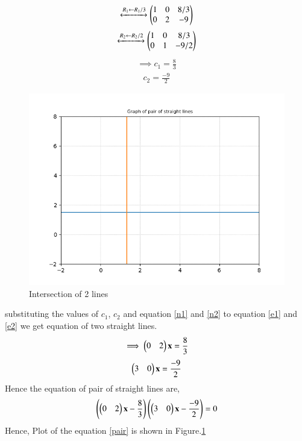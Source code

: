 \documentclass[journal,12pt,twocolumn]{IEEEtran}
\begin{document}
\begin{align}
\xleftrightarrow[]{R_1\leftarrow R_1/3}\begin{pmatrix}1&0&8/3\\0&2&-9\end{pmatrix}
\end{align}
\begin{align}
\xleftrightarrow[]{R_2\leftarrow R_2/2}\begin{pmatrix}1&0&8/3\\0&1&-9/2\end{pmatrix}
\end{align}
\begin{align}
\implies c_1 = \frac{8}{3}
\end{align}
\begin{align}
c_2 = \frac{-9}{2}
\end{align}
\begin{figure}[ht!]
\centering
\includegraphics[width=\columnwidth]{Figure_1.png}
\caption{Intersection of 2 lines}
\label{Figure_1}
\end{figure}
substituting the values of $c_1$, $c_2$ and equation \eqref{n1} and \eqref{n2} to equation \eqref{e1} and \eqref{e2} we get equation of two straight lines.
\begin{align}
\implies \begin{pmatrix}0&2\end{pmatrix}\mathbf{x} = \frac{8}{3}
\end{align}
\begin{align}
\begin{pmatrix}3&0\end{pmatrix}\mathbf{x} = \frac{-9}{2}
\end{align}
Hence the equation of pair of straight lines are,
\begin{align}
\left(\begin{pmatrix}0&2\end{pmatrix}\mathbf{x}-\frac{8}{3}\right)\left(\begin{pmatrix}3&0\end{pmatrix}\mathbf{x} - \frac{-9}{2}\right) = 0
\label{pair}
\end{align}
Hence, Plot of the equation \eqref{pair} is shown in Figure.\ref{Figure_1}
\end{document}
